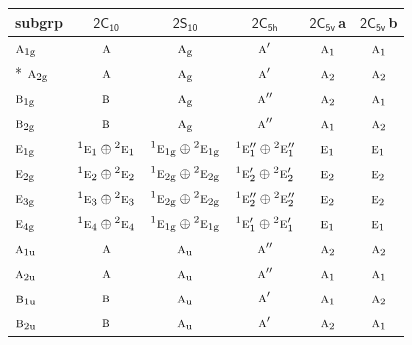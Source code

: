 \documentclass[10pt,a4paper]{article}
\numberwithin{equation}{section}
\newcommand{\grp}[1]{\mathsf{#1}}
\newcommand{\irr}[1]{\text{\normalfont\scshape #1}}
\newcommand{\conjpair}[1]{{}^{#1}}
\newcommand{\ptag}[1]{\mathrm{#1}}
\newcommand{\clsletter}[1]{\,{\scriptsize\color{black!55}#1}}
\begin{document}
{\small\begin{longtable}{@{}lccccc@{}}\toprule
subgrp & \href{2C10.pdf}{$\grp{2C_{10}}$} & \href{2S10.pdf}{$\grp{2S_{10}}$} & \href{2C5h.pdf}{$\grp{2C_{5h}}$} & \href{2C5v.pdf}{$\grp{2C_{5v}}$}\clsletter{a} & \href{2C5v.pdf}{$\grp{2C_{5v}}$}\clsletter{b}\\\midrule\endhead
\bottomrule\endfoot\endlastfoot
$\irr{a}_{1\ptag{g}}$ & $\irr{a}$ & $\irr{a}_{\ptag{g}}$ & $\irr{a}'$ & $\irr{a}_{1}$ & $\irr{a}_{1}$\\*
$\irr{a}_{2\ptag{g}}$ & $\irr{a}$ & $\irr{a}_{\ptag{g}}$ & $\irr{a}'$ & $\irr{a}_{2}$ & $\irr{a}_{2}$\\
$\irr{b}_{1\ptag{g}}$ & $\irr{b}$ & $\irr{a}_{\ptag{g}}$ & $\irr{a}''$ & $\irr{a}_{2}$ & $\irr{a}_{1}$\\
$\irr{b}_{2\ptag{g}}$ & $\irr{b}$ & $\irr{a}_{\ptag{g}}$ & $\irr{a}''$ & $\irr{a}_{1}$ & $\irr{a}_{2}$\\
$\irr{e}_{1\ptag{g}}$ & $\conjpair{1}\irr{e}_{1}\oplus \conjpair{2}\irr{e}_{1}$ & $\conjpair{1}\irr{e}_{1\ptag{g}}\oplus \conjpair{2}\irr{e}_{1\ptag{g}}$ & $\conjpair{1}\irr{e}_{1}''\oplus \conjpair{2}\irr{e}_{1}''$ & $\irr{e}_{1}$ & $\irr{e}_{1}$\\
$\irr{e}_{2\ptag{g}}$ & $\conjpair{1}\irr{e}_{2}\oplus \conjpair{2}\irr{e}_{2}$ & $\conjpair{1}\irr{e}_{2\ptag{g}}\oplus \conjpair{2}\irr{e}_{2\ptag{g}}$ & $\conjpair{1}\irr{e}_{2}'\oplus \conjpair{2}\irr{e}_{2}'$ & $\irr{e}_{2}$ & $\irr{e}_{2}$\\
$\irr{e}_{3\ptag{g}}$ & $\conjpair{1}\irr{e}_{3}\oplus \conjpair{2}\irr{e}_{3}$ & $\conjpair{1}\irr{e}_{2\ptag{g}}\oplus \conjpair{2}\irr{e}_{2\ptag{g}}$ & $\conjpair{1}\irr{e}_{2}''\oplus \conjpair{2}\irr{e}_{2}''$ & $\irr{e}_{2}$ & $\irr{e}_{2}$\\
$\irr{e}_{4\ptag{g}}$ & $\conjpair{1}\irr{e}_{4}\oplus \conjpair{2}\irr{e}_{4}$ & $\conjpair{1}\irr{e}_{1\ptag{g}}\oplus \conjpair{2}\irr{e}_{1\ptag{g}}$ & $\conjpair{1}\irr{e}_{1}'\oplus \conjpair{2}\irr{e}_{1}'$ & $\irr{e}_{1}$ & $\irr{e}_{1}$\\
$\irr{a}_{1\ptag{u}}$ & $\irr{a}$ & $\irr{a}_{\ptag{u}}$ & $\irr{a}''$ & $\irr{a}_{2}$ & $\irr{a}_{2}$\\
$\irr{a}_{2\ptag{u}}$ & $\irr{a}$ & $\irr{a}_{\ptag{u}}$ & $\irr{a}''$ & $\irr{a}_{1}$ & $\irr{a}_{1}$\\
$\irr{b}_{1\ptag{u}}$ & $\irr{b}$ & $\irr{a}_{\ptag{u}}$ & $\irr{a}'$ & $\irr{a}_{1}$ & $\irr{a}_{2}$\\
$\irr{b}_{2\ptag{u}}$ & $\irr{b}$ & $\irr{a}_{\ptag{u}}$ & $\irr{a}'$ & $\irr{a}_{2}$ & $\irr{a}_{1}$\\

\end{longtable}}
\end{document}

